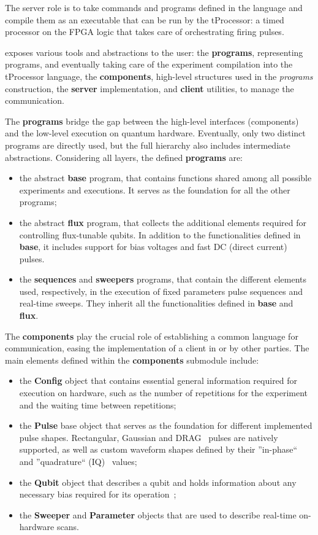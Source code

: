 The server role is to take commands and programs defined in the \Qibosoq language and compile them as an executable that can be run by the \Qick tProcessor: a timed processor on the FPGA logic that takes care of orchestrating firing pulses.

\Qibosoq exposes various tools and abstractions to the user: the \textbf{programs}, representing \Qick programs, and eventually taking care of the experiment compilation into the tProcessor language, the \textbf{components}, high-level structures used in the \textit{programs} construction, the \textbf{server} implementation, and \textbf{client} utilities, to manage the communication.

The \textbf{programs} bridge the gap between the high-level interfaces (components) and the low-level execution on quantum hardware.
Eventually, only two distinct programs are directly used, but the full hierarchy also includes intermediate abstractions.
Considering all layers, the defined \textbf{programs} are:
\begin{itemize}
    \item the abstract \textbf{base} program, that contains functions shared among all possible experiments and executions. It serves as the foundation for all the other \Qibosoq programs;
    \item the abstract \textbf{flux} program, that collects the additional elements required for controlling flux-tunable qubits. In addition to the functionalities defined in \textbf{base}, it includes support for bias voltages and fast DC (direct current) pulses.
    \item the \textbf{sequences} and \textbf{sweepers} programs, that contain the different elements used, respectively, in the execution of fixed parameters pulse sequences and real-time sweeps. They inherit all the functionalities defined in \textbf{base} and \textbf{flux}.
\end{itemize}

The \textbf{components} play the crucial role of establishing a common language for communication, easing the implementation of a \Qibosoq client in \Qibolab or by other parties.
The main elements defined within the \textbf{components} submodule include:
\begin{itemize}
    \item the \textbf{Config} object that contains essential general information required for execution on hardware, such as the number of repetitions for the experiment and the waiting time between repetitions;
    \item the \textbf{Pulse} base object that serves as the foundation for different implemented pulse shapes. Rectangular, Gaussian and DRAG~\cite{Gambetta2011} pulses are natively supported, as well as custom waveform shapes defined by their ''in-phase`` and ''quadrature`` (IQ)~\cite{Franks1969,Naidu2003} values;
    \item the \textbf{Qubit} object that describes a qubit and holds information about any necessary bias required for its operation~\cite{Hutchings2017};
    \item the \textbf{Sweeper} and \textbf{Parameter} objects that are used to describe real-time on-hardware scans.
\end{itemize}

